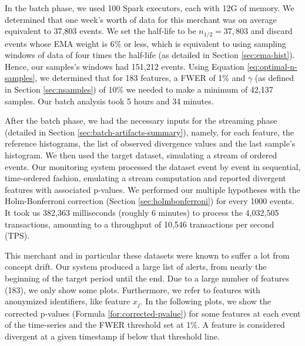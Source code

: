 In the batch phase, we used 100 Spark executors, each with 12G of memory. We determined that one week's worth of data for this merchant was on average equivalent to 37,803 events. We set the half-life to be $n_{1/2}=37,803$ and discard events whose EMA weight is 6\% or less, which is equivalent to using sampling windows of data of four times the half-life (as detailed in Section \ref{sec:ema-hist}). Hence, our samples's windows had 151,212 events. Using Equation \ref{eq:optimal-n-samples}, we determined that for 183 features, a FWER of 1\% and $\gamma$ (as defined in Section \ref{sec:nsamples}) of 10\% we needed to make a minimum of 42,137 samples. Our batch analysis took 5 hours and 34 minutes.

After the batch phase, we had the necessary inputs for the streaming phase (detailed in Section \ref{sec:batch-artifacts-summary}), namely, for each feature, the reference histograms, the list of observed divergence values and the last sample's histogram. We then used the target dataset, simulating a stream of ordered events. Our monitoring system processed the dataset event by event in sequential, time-ordered fashion, emulating a stream computation and reported divergent features with associated p-values. We performed our multiple hypotheses with the Holm-Bonferroni correction (Section \ref{sec:holmbonferroni}) for every 1000 events. It took us 382,363 milliseconds (roughly 6 minutes) to process the 4,032,505 transactions, amounting to a throughput of 10,546 transactions per second (TPS).

This merchant and in particular these datasets were known to suffer a lot from concept drift. Our system produced a large list of alerts, from nearly the beginning of the target period until the end. Due to a large number of features (183), we only show some plots. Furthermore, we refer to features with anonymized identifiers, like feature $x_j$. In the following plots, we show the corrected p-values (Formula \ref{for:corrected-pvalue}) for some features at each event of the time-series and the FWER threshold set at 1\%. A feature is considered divergent at a given timestamp if below that threshold line.

